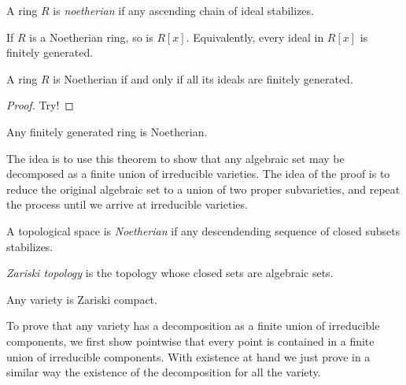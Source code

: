 \documentclass{book}
\begin{document}
\begin{definition}
\label{definition-noetherian-ring}
A ring $R$ is {\it noetherian}
if any ascending chain of ideal stabilizes.
\end{definition}

\begin{theorem}
\label{theorem-hilberts-basis}
If $R$ is a Noetherian ring, so is $R[x]$.
Equivalently, every ideal in $R[x]$ is
finitely generated.
\end{theorem}

\begin{lemma}
\label{lemma-noeth-iff-ideal-finit-gener}
A ring $R$ is Noetherian
if and only if
all its ideals are finitely generated.
\end{lemma}

\begin{proof}
Try!
\end{proof}

\begin{theorem}
\label{theorem-hilberts-basis-misha}
Any finitely generated ring is Noetherian.
\end{theorem}

\noindent
The idea is to use this theorem
to show that any algebraic set may be
decomposed
as a finite union of irreducible varieties.
The idea of the proof is to reduce the
original algebraic set
to a union of two proper subvarieties, and
repeat the process until we arrive at
irreducible varieties.

\begin{definition}
\label{definition-noeth-topol-space}
A topological space is {\it Noetherian}
if any descendending sequence of closed
subsets stabilizes.
\end{definition}

\begin{definition}
\label{definition-zariski-topology}
{\it Zariski topology} is the topology
whose closed sets are algebraic sets.
\end{definition}

\begin{exercise}[Misha]
\label{exercise-varie-zaris-compa}
Any variety is Zariski compact.
\end{exercise}

\noindent
To prove that any variety has a decomposition
as a finite union of irreducible components,
we first show pointwise that every point
is contained in a finite union of irreducible
components.
With existence at hand we just prove
in a similar way the existence of the
decomposition
for all the variety.
\end{document}
